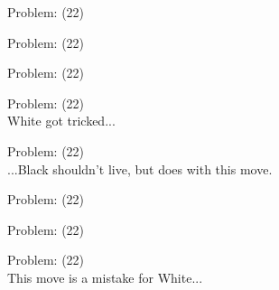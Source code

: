 \documentclass[11pt]{article}
\begin{document}
\begin{minipage}[t]{0.5\textwidth}
  {\centering
  
  Problem: (22)\\
  
  }
\end{minipage}
\begin{minipage}[t]{0.5\textwidth}
  {\centering
  
  Problem: (22)\\
  
  }
\end{minipage}
\begin{minipage}[t]{0.5\textwidth}
  {\centering
  
  Problem: (22)\\
  
  }
\end{minipage}
\begin{minipage}[t]{0.5\textwidth}
  {\centering
  
  Problem: (22)\\
  White got tricked...\\
  }
\end{minipage}
\begin{minipage}[t]{0.5\textwidth}
  {\centering
  
  Problem: (22)\\
  ...Black shouldn't live, but does with this move.\\
  }
\end{minipage}
\begin{minipage}[t]{0.5\textwidth}
  {\centering
  
  Problem: (22)\\
  
  }
\end{minipage}
\begin{minipage}[t]{0.5\textwidth}
  {\centering
  
  Problem: (22)\\
  
  }
\end{minipage}
\begin{minipage}[t]{0.5\textwidth}
  {\centering
  
  Problem: (22)\\
  This move is a mistake for White...\\
  }
\end{minipage}
\end{document}
